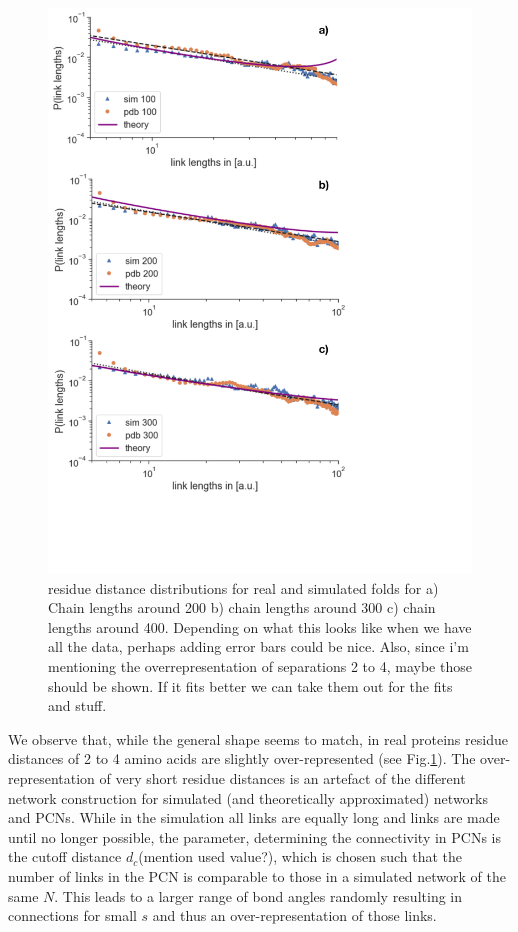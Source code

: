 \documentclass[
reprint,
twocolumn,
amsmath,amssymb,superscriptaddress,aps,
pre]{revtex4-1}
\newcommand{\red}[1]{\textcolor{red!80!black}{#1}}
\newcommand{\blue}[1]{\textcolor{blue!80!black}{#1}}
\begin{document}
\begin{figure}[t]
        \centering
	\includegraphics[width=\columnwidth]{paper/figures/Fig3/Fig3.pdf}
        \caption{residue distance distributions for real and simulated folds for a) Chain lengths around 200 b) chain lengths around 300 c) chain lengths around 400. \red{Depending on what this looks like when we have all the data, perhaps adding error bars could be nice. Also, since i'm mentioning the overrepresentation of separations 2 to 4, maybe those should be shown. If it fits better we can take them out for the fits and stuff.}
        }
        \label{fig:sdd}
\end{figure}

We observe that, while the general shape seems to match, in real proteins residue distances of 2 to 4 amino acids are slightly over-represented (see Fig.\ref{fig:sdd}).
The over-representation of very short residue distances is an artefact of the different network construction for simulated (and theoretically approximated) networks and PCNs. While in the simulation all links are equally long and links are made until no longer possible, the parameter, determining the connectivity in PCNs is the cutoff distance $d_c$\blue{(mention used value?)}, which is chosen such that the number of links in the PCN is comparable to those in a simulated network of the same $N$. This leads to a larger range of bond angles randomly resulting in connections for small $s$ and thus an over-representation of those links.
\end{document}
